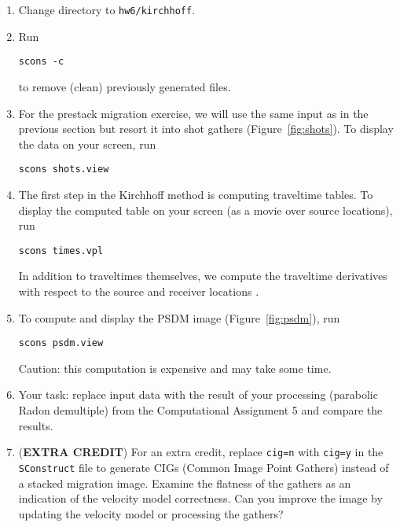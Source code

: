 \begin{enumerate}

\item Change directory to \texttt{hw6/kirchhoff}.
\item Run
\begin{verbatim}
scons -c
\end{verbatim}
to remove (clean) previously generated files.
\item For the prestack migration exercise, we will use the same input as in the previous section but resort it into shot gathers (Figure~\ref{fig:shots}). To display the data on your screen, run
\begin{verbatim}
scons shots.view
\end{verbatim}
\item The first step in the Kirchhoff method is computing traveltime tables. To display the computed table on your screen (as a movie over source locations), run
\begin{verbatim}
scons times.vpl
\end{verbatim}
In addition to traveltimes themselves, we compute the traveltime
derivatives with respect to the source and receiver
locations \cite[]{eikods}.
\item To compute and display the PSDM image (Figure~\ref{fig:psdm}), run 
\begin{verbatim}
scons psdm.view
\end{verbatim}
Caution: this computation is expensive and may take some time.

\item Your task: replace input data with the result of your processing (parabolic Radon demultiple) from the Computational Assignment 5 and compare the results.

\item (\textbf{EXTRA CREDIT}) For an extra credit, replace \texttt{cig=n} with \texttt{cig=y} in the \texttt{SConstruct} file to generate CIGs (Common Image Point Gathers) instead of a stacked migration image. Examine the flatness of the gathers as an indication of the velocity model correctness. Can you improve the image by updating the velocity model or processing the gathers?

\end{enumerate}

\lstset{language=python,numbers=left,numberstyle=\tiny,showstringspaces=false}








